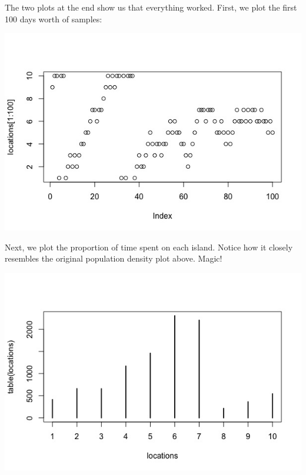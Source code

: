 \documentclass[11pt]{article}
\begin{document}
The two plots at the end show us that everything worked.  First, we plot the first 100 days worth of samples:

\includegraphics[width=.9\linewidth]{figures/week10/samples.jpeg}

Next, we plot the proportion of time spent on each island.  Notice how it closely resembles the original population density plot above.  Magic!

\includegraphics[width=.9\linewidth]{figures/week10/sampledPop.jpeg}
\end{document}
